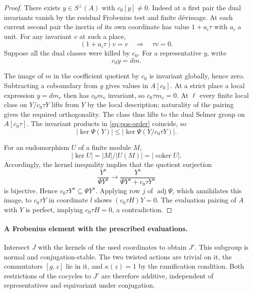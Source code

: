 \begin{proof}
There exists \(y\in S^\perp(A)\) with \(c_0[y]\ne0\).
Indeed at a first pair the dual invariants vanish by the
residual Frobenius test and finite dévissage. At each current
second pair the inertia of its own coordinate has value
\(1+a_i \tau\) with \(a_i\) a unit. For any invariant \(v\) at such a place,
\[
 (1+a_i\tau)v=v\quad\Longrightarrow\quad \tau v=0 .
\] Suppose all the dual classes were killed
by \(c_0\). For a representative \(y\), write
\[
 c_0y=dm.
\]

The image of \(m\) in the coefficient quotient by \(c_0\)
is invariant globally, hence zero. Subtracting a coboundary
from \(y\) gives values in \(A[c_0]\). At a strict place a
local expression \(y=dm_v\) then has \(c_0m_v\) invariant,
so \(c_0\tau m_v=0\). At \(\ell\) every finite local class
on \(Y/c_0\tau Y\) lifts from \(Y\) by the local description;
naturality of the pairing gives the required orthogonality.
The class thus lifts to the dual Selmer group on \(A[c_0\tau]\).
The invariant products in \eqref{eq:pos-order} coincide,
so
\[
 |\ker\Psi(Y)|\le |\ker\Psi(Y/c_0\tau Y)|.
\]

For an endomorphism \(U\) of a finite module \(M\),
\[
 |\ker U|=|M|/|U(M)|=|\operatorname{coker}U|.
\] Accordingly, the kernel inequality implies
that the quotient surjection
\[
 \frac{Y^a}{\Psi Y^a}
 \longrightarrow\frac{Y^a}{\Psi Y^a+c_0\tau Y^a}
\]
is bijective. Hence \(c_0\tau Y^a\subseteq\Psi Y^a\). Applying
row \(j\) of \(\operatorname{adj}\Psi\), which annihilates this
image, to \(c_0\tau Y\) in coordinate \(l\) shows
\((c_0\tau H)Y=0\). The evaluation pairing of \(A\) with \(Y\)
is perfect, implying \(c_0\tau H=0\), a contradiction.

\end{proof}
\paragraph{A Frobenius element with the prescribed evaluations.}
Intersect \(J\) with the kernels of the used coordinates to
obtain \(J'\). This subgroup is normal and conjugation-stable.
The two twisted actions are trivial on it, the commutators
\([g,z]\) lie in it, and \(\kappa(z)=1\) by the ramification
condition. Both restrictions of the cocycles to \(J'\) are
therefore additive, independent of representatives and
equivariant under conjugation.

